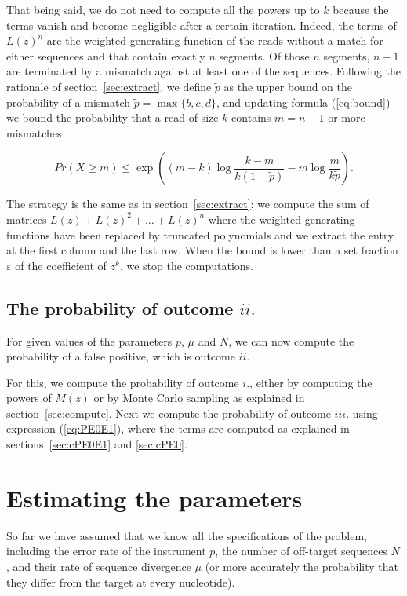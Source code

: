 \documentclass{article}
\begin{document}
That being said, we do not need to compute all the powers up to $k$
because the terms vanish and become negligible after a certain iteration.
Indeed, the terms of $L(z)^n$ are the weighted generating function of the
reads without a match for either sequences and that contain exactly $n$
segments. Of those $n$ segments, $n-1$ are terminated by a mismatch
against at least one of the sequences. Following the rationale of
section~\ref{sec:extract}, we define $\tilde{p}$ as the upper bound on the
probability of a mismatch $\tilde{p} = \max\{b,c,d\}$, and updating
formula (\ref{eq:bound}) we bound the probability that a read of size $k$
contains $m = n-1$ or more mismatches

\begin{equation*}
Pr(X \geq m) \leq \exp \left( (m-k)\log \frac{k-m}{k(1-\tilde{p})} -m\log
\frac{m}{k\tilde{p}} \right).
\end{equation*}

The strategy is the same as in section~\ref{sec:extract}: we compute the
sum of matrices $L(z) + L(z)^2 + \ldots + L(z)^n$ where the weighted
generating functions have been replaced by truncated polynomials and we
extract the entry at the first column and the last row. When the bound is
lower than a set fraction $\varepsilon$ of the coefficient of $z^k$, we
stop the computations.

\subsection{The probability of outcome $ii.$}

For given values of the parameters $p$, $\mu$ and $N$, we can now compute
the probability of a false positive, which is outcome $ii$.

For this, we compute the probability of outcome $i.$, either by computing
the powers of $M(z)$ or by Monte Carlo sampling as explained in
section~\ref{sec:compute}. Next we compute the probability of outcome
$iii.$ using expression (\ref{eq:PE0E1}), where the terms are computed as
explained in sections~\ref{sec:cPE0E1} and \ref{sec:cPE0}.

\section{Estimating the parameters}
\label{sec:est}

So far we have assumed that we know all the specifications of the problem,
including the error rate of the instrument $p$, the number of off-target
sequences $N$, and their rate of sequence divergence $\mu$ (or more
accurately the probability that they differ from the target at every
nucleotide).
\end{document}
